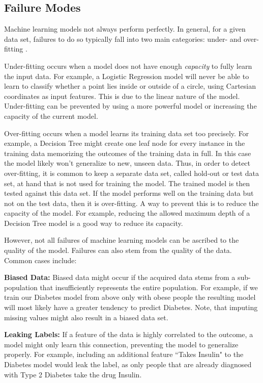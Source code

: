 \subsection{Failure Modes}
Machine learning models not always perform perfectly.
In general, for a given data set, failures to do so typically fall into two main categories: under- and over-fitting \cite{mlbook}.

Under-fitting occurs when a model does not have enough \emph{capacity} to fully learn the input data.
For example, a Logistic Regression model will never be able to learn to classify whether a point lies inside or outside of a circle, using Cartesian coordinates as input features.
This is due to the linear nature of the model.
Under-fitting can be prevented by using a more powerful model or increasing the capacity of the current model.

Over-fitting occurs when a model learns its training data set too precisely.
For example, a Decision Tree might create one leaf node for every instance in the training data memorizing the outcomes of the training data in full.
In this case the model likely won't generalize to new, unseen data.
Thus, in order to detect over-fitting, it is common to keep a separate data set, called hold-out or test data set, at hand that is not used for training the model.
The trained model is then tested against this data set.
If the model performs well on the training data but not on the test data, then it is over-fitting.
A way to prevent this is to reduce the capacity of the model.
For example, reducing the allowed maximum depth of a Decision Tree model is a good way to reduce its capacity.

However, not all failures of machine learning models can be ascribed to the quality of the model.
Failures can also stem from the quality of the data.
Common cases include:

\par \noindent \textbf{Biased Data:}
Biased data might occur if the acquired data stems from a sub-population that insufficiently represents the entire population.
For example, if we train our Diabetes model from above only with obese people the resulting model will most likely have a greater tendency to predict Diabetes.
Note, that imputing missing values might also result in a biased data set.

\par \noindent \textbf{Leaking Labels:}
If a feature of the data is highly correlated to the outcome, a model might only learn this connection, preventing the model to generalize properly.
For example, including an additional feature ``Takes Insulin" to the Diabetes model would leak the label, as only people that are already diagnosed with Type 2 Diabetes take the drug Insulin.

